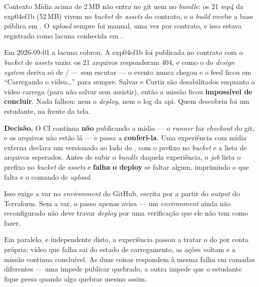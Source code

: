 \begin{especificacao}{Contexto}
Mídia acima de 2\,MB não entra no git nem no \emph{bundle}: os 21 \emph{mp4}
da exp04ef1b (52\,MB) vivem no \emph{bucket} de \emph{assets} do contrato, e o
\emph{build} recebe a base pública em . O
\emph{upload} sempre foi manual, uma vez por contrato, e isso estava registrado
como lacuna conhecida em .

Em 2026-09-01 a lacuna cobrou. A exp04ef1b foi publicada no contrato
 com o \emph{bucket} de \emph{assets} vazio: os 21 arquivos
responderam 404, e como o  do \emph{design system} deriva
 só de / --- sem escutar  --- o
evento  nunca chegou e o feed ficou em \enquote{Carregando o
vídeo\ldots} para sempre. Salvar e Curtir são desabilitados enquanto o vídeo
carrega (para não salvar sem assistir), então a missão ficou \textbf{impossível
de concluir}. Nada falhou: nem o \emph{deploy}, nem o log da api. Quem
descobriu foi um estudante, na frente da tela.
\end{especificacao}

\textbf{Decisão.} O CI continua \textbf{não} publicando a mídia --- o
\emph{runner} faz \emph{checkout} do git, e os arquivos não estão lá --- e
passa a \textbf{conferi-la}. Uma experiência com mídia externa declara um
 versionado ao lado do , com o
prefixo no \emph{bucket} e a lista de arquivos esperados. Antes de subir o
\emph{bundle} daquela experiência, o \emph{job}  lista o
prefixo no \emph{bucket} de \emph{assets} e \textbf{falha o deploy} se faltar
algum, imprimindo o que falta e o comando de \emph{upload}.

Isso exige a var  no \emph{environment} do GitHub, escrita
por  a partir do \emph{output}
 do Terraform. Sem a var, o passo apenas avisa --- um
\emph{environment} ainda não reconfigurado não deve travar \emph{deploy} por
uma verificação que ele não tem como fazer.

Em paralelo, e independente disto, a experiência passou a tratar o 
do  por conta própria: vídeo que falha sai do estado de
carregamento, as ações voltam e a missão continua concluível. As duas coisas
respondem à mesma falha em camadas diferentes --- uma impede publicar quebrado,
a outra impede que o estudante fique preso quando algo quebrar mesmo assim.

